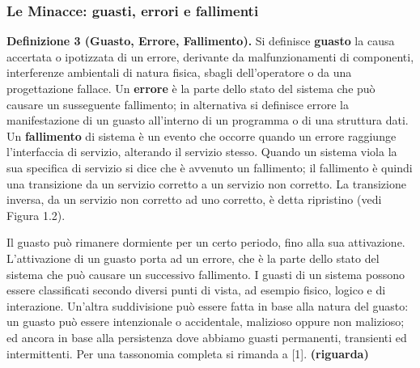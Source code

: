 \documentclass[14pt]{extarticle}
\begin{document}
\subsubsection{Le Minacce: guasti, errori e fallimenti}
\textbf{Definizione 3 (Guasto, Errore, Fallimento).} Si definisce \textbf{guasto} la causa accertata o ipotizzata di un errore, derivante da malfunzionamenti di componenti, interferenze ambientali di natura fisica, sbagli dell’operatore o da una progettazione fallace.
Un \textbf{errore} è la parte dello stato del sistema che può causare un susseguente fallimento; in alternativa si definisce errore la manifestazione di un guasto all’interno di un programma o di una struttura dati. Un \textbf{fallimento} di sistema è un evento che
occorre quando un errore raggiunge l’interfaccia di servizio, alterando il servizio stesso. Quando un sistema viola la sua specifica di servizio si dice che è avvenuto un
fallimento; il fallimento è quindi una transizione da un servizio corretto a un servizio
non corretto. La transizione inversa, da un servizio non corretto ad uno corretto, è
detta ripristino (vedi Figura 1.2).


Il guasto può rimanere dormiente per un certo periodo, fino alla sua attivazione. L’attivazione di un guasto porta ad un errore, che è la parte dello
stato del sistema che può causare un successivo fallimento. I guasti di un
sistema possono essere classificati secondo diversi punti di vista, ad esempio
fisico, logico e di interazione. Un’altra suddivisione può essere fatta in base
alla natura del guasto: un guasto può essere intenzionale o accidentale, malizioso oppure non malizioso; ed ancora in base alla persistenza dove abbiamo
guasti permanenti, transienti ed intermittenti. Per una tassonomia completa
si rimanda a [1]. \textbf{(riguarda)}
\end{document}
